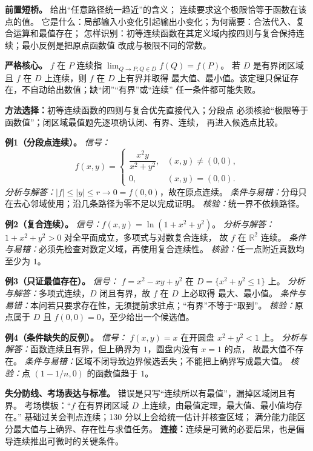 
\begin{knowledgeBox}
\textbf{前置短桥。}
给出“任意路径统一趋近”的含义；
连续要求这个极限恰等于函数在该点的值。
它是什么：局部输入小变化引起输出小变化；为何需要：合法代入、复合运算和最值存在；
怎样识别：初等连续函数在其定义域内按四则与复合保持连续；最小反例是把原点函数值
改成与极限不同的常数。

\textbf{严格核心。}
\(f\) 在 \(P\) 连续指 \(\lim_{Q\to P,Q\in D}f(Q)=f(P)\)。
若 \(D\) 是有界闭区域且 \(f\) 在 \(D\) 上连续，则 \(f\) 在 \(D\) 上有界并取得
最大值、最小值。该定理只保证存在，不自动给出数值；缺“闭”“有界”或“连续”
任一条件都可能失败。

\textbf{方法选择：}初等连续函数的四则与复合优先直接代入；分段点
必须核验“极限等于函数值”；闭区域最值题先逐项确认闭、有界、连续，
再进入候选点比较。

\textbf{例1（分段点连续）。}
\emph{信号：}
\[
f(x,y)=
\begin{cases}
\dfrac{x^2y}{x^2+y^2},&(x,y)\ne(0,0),\\
0,&(x,y)=(0,0).
\end{cases}
\]
\emph{分析与解答：}\(|f|\le |y|\le r\to0=f(0,0)\)，故在原点连续。
\emph{条件与易错：}分母只在去心邻域使用；沿几条路径为零不足以完成证明。
\emph{核验：}统一界不依赖路径。

\textbf{例2（复合连续）。}
\emph{信号：}\(f(x,y)=\ln(1+x^2+y^2)\)。
\emph{分析与解答：}\(1+x^2+y^2>0\) 对全平面成立，多项式与对数复合连续，
故 \(f\) 在 \(\mathbb R^2\) 连续。
\emph{条件与易错：}必须先检查对数定义域，再使用复合连续性。
\emph{核验：}任一点附近真数均至少为 \(1\)。

\textbf{例3（只证最值存在）。}
\emph{信号：} \(f=x^2-xy+y^2\) 在
\(D=\{x^2+y^2\le1\}\) 上。
\emph{分析与解答：}多项式连续，\(D\) 闭且有界，故 \(f\) 在 \(D\) 上必取得
最大、最小值。
\emph{条件与易错：}本问若只要求存在性，无须提前求驻点；“有界”不等于“取到”。
\emph{核验：}原点属于 \(D\) 且 \(f(0,0)=0\)，至少给出一个候选值。

\textbf{例4（条件缺失的反例）。}
\emph{信号：} \(f(x,y)=x\) 在开圆盘 \(x^2+y^2<1\) 上。
\emph{分析与解答：}函数连续且有界，但上确界为 \(1\)，圆盘内没有 \(x=1\) 的点，
故最大值不存在。
\emph{条件与易错：}区域不闭导致边界候选丢失；不能把上确界写成最大值。
\emph{核验：}点 \((1-1/n,0)\) 的函数值趋于 \(1\)。

\textbf{失分防线、考场表达与标准。}
错误是只写“连续所以有最值”，漏掉区域闭且有界。
考场模板：“\(f\) 在有界闭区域 \(D\) 上连续，由最值定理，最大值、最小值均存在。”
基础过关会判点连续；130 分以上会给统一估计并核查区域；
满分能力能区分最大值与上确界、存在性与求值任务。
\textbf{连接：}连续是可微的必要后果，也是偏导连续推出可微时的关键条件。
\end{knowledgeBox}

